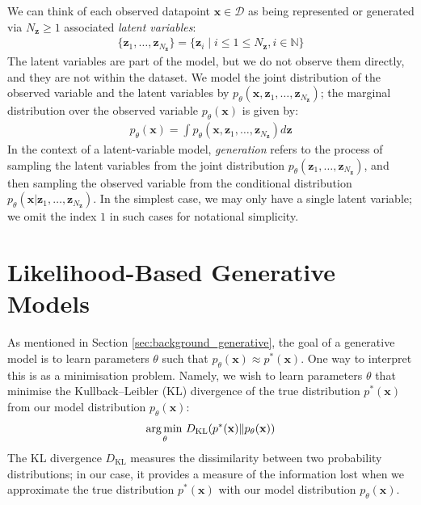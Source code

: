 \documentclass[ oneside,%
                    author={George Herbert},
                    degree={MSci},
                     title={Diffusion Models for Time-Evolving Precipitation Fields},
                  subtitle={}]{dissertation}
\begin{document}
We can think of each observed datapoint $\mathbf{x}\in\mathcal{D}$ as being represented or generated via $N_{\mathbf{z}}\ge 1$ associated \textit{latent variables}:
\begin{align}
      \{\mathbf{z}_1,\ldots,\mathbf{z}_{N_\mathbf{z}}\} = \{\mathbf{z}_i \mid i \le 1 \le N_{\mathbf{z}}, i \in \mathbb{N} \}
\end{align}
The latent variables are part of the model, but we do not observe them directly, and they are not within the dataset. We model the joint distribution of the observed variable and the latent variables by $p_\theta(\mathbf{x},\mathbf{z}_1,\ldots,\mathbf{z}_{N_\mathbf{z}})$; the marginal distribution over the observed variable $p_\theta(\mathbf{x})$ is given by:
\begin{align}
      p_\theta(\mathbf{x})=\int p_\theta(\mathbf{x},\mathbf{z}_1,\ldots,\mathbf{z}_{N_\mathbf{z}}) d\mathbf{z}
\end{align}
In the context of a latent-variable model, \textit{generation} refers to the process of sampling the latent variables from the joint distribution $p_\theta(\mathbf{z}_1,\ldots,\mathbf{z}_{N_\mathbf{z}})$, and then sampling the observed variable from the conditional distribution $p_\theta(\mathbf{x}|\mathbf{z}_1,\ldots,\mathbf{z}_{N_\mathbf{z}})$. In the simplest case, we may only have a single latent variable; we omit the index $1$ in such cases for notational simplicity.

\section{Likelihood-Based Generative Models}
\label{sec:background_unbiased_objective}

As mentioned in Section \ref{sec:background_generative}, the goal of a generative model is to learn parameters $\theta$ such that $p_\theta(\mathbf{x})\approx p^*(\mathbf{x})$. One way to interpret this is as a minimisation problem. Namely, we wish to learn parameters $\theta$ that minimise the Kullback--Leibler (KL) divergence of the true distribution $p^*(\mathbf{x})$ from our model distribution $p_\theta(\mathbf{x})$:
\begin{align}
      \operatorname*{arg\,min\,}_\theta D_{\mathrm{KL}}(p^*(\mathbf{x})\Vert p_\theta(\mathbf{x}))
\end{align}
The KL divergence $D_{\mathrm{KL}}$ measures the dissimilarity between two probability distributions; in our case, it provides a measure of the information lost when we approximate the true distribution $p^*(\mathbf{x})$ with our model distribution $p_\theta(\mathbf{x})$.
\end{document}
